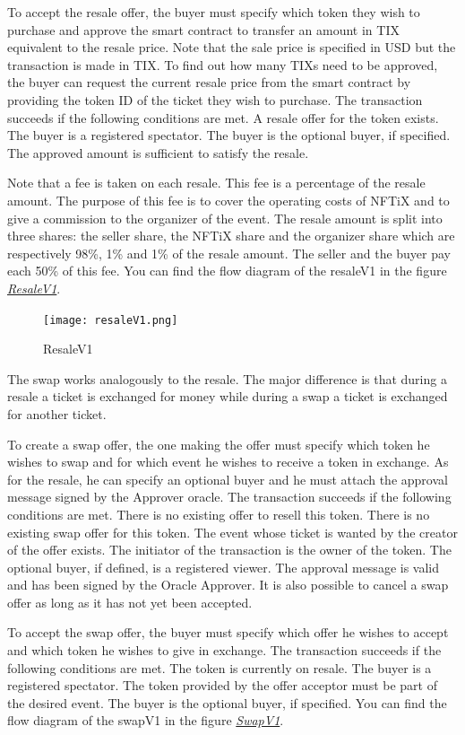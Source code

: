 \documentclass[a4paper,11pt,oneside]{report}
\begin{document}
To accept the resale offer, the buyer must specify which token they wish to purchase and approve the smart contract to transfer an amount in TIX equivalent to the resale price. Note that the sale price is specified in USD but the transaction is made in TIX. To find out how many TIXs need to be approved, the buyer can request the current resale price from the smart contract by providing the token ID of the ticket they wish to purchase. The transaction succeeds if the following conditions are met. A resale offer for the token exists. The buyer is a registered spectator. The buyer is the optional buyer, if specified. The approved amount is sufficient to satisfy the resale.

Note that a fee is taken on each resale. This fee is a percentage of the resale amount. The purpose of this fee is to cover the operating costs of NFTiX and to give a commission to the organizer of the event. The resale amount is split into three shares: the seller share, the NFTiX share and the organizer share which are respectively 98\%, 1\% and 1\% of the resale amount. The seller and the buyer pay each 50\% of this fee. You can find the flow diagram of the resaleV1 in the figure \hyperref[fig:resaleV1]{ \textit{ResaleV1}}.

\begin{figure}[h!]
  \texttt{[image: resaleV1.png]}
  \caption{ResaleV1}
  \label{fig:resaleV1}
\end{figure}

The swap works analogously to the resale. The major difference is that during a resale a ticket is exchanged for money while during a swap a ticket is exchanged for another ticket.

To create a swap offer, the one making the offer must specify which token he wishes to swap and for which event he wishes to receive a token in exchange. As for the resale, he can specify an optional buyer and he must attach the approval message signed by the Approver oracle. The transaction succeeds if the following conditions are met. There is no existing offer to resell this token. There is no existing swap offer for this token. The event whose ticket is wanted by the creator of the offer exists. The initiator of the transaction is the owner of the token. The optional buyer, if defined, is a registered viewer. The approval message is valid and has been signed by the Oracle Approver. It is also possible to cancel a swap offer as long as it has not yet been accepted.

To accept the swap offer, the buyer must specify which offer he wishes to accept and which token he wishes to give in exchange. The transaction succeeds if the following conditions are met. The token is currently on resale. The buyer is a registered spectator. The token provided by the offer acceptor must be part of the desired event. The buyer is the optional buyer, if specified. You can find the flow diagram of the swapV1 in the figure \hyperref[fig:swapV1]{ \textit{SwapV1}}.
\end{document}
